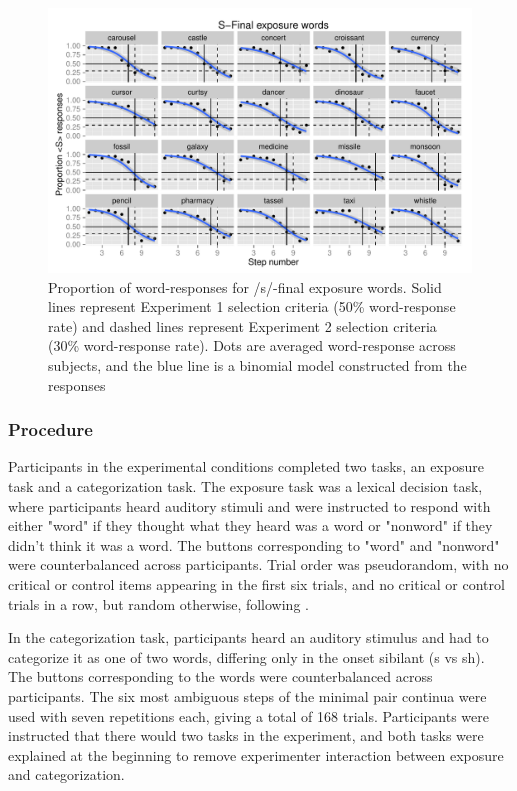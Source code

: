 \begin{figure}
\includegraphics[width=\textwidth]{sfinalpretest.pdf}
\caption{Proportion of word-responses for /s/-final exposure words. Solid lines represent Experiment 1 selection criteria (50\% word-response rate) and dashed lines represent Experiment 2 selection criteria (30\% word-response rate).  Dots are averaged word-response across subjects, and the blue line is a binomial model constructed from the responses}
\end{figure}

\subsubsection{Procedure}

Participants in the experimental conditions completed two tasks, an exposure task and a categorization task.  
The exposure task was a lexical decision task, where participants heard auditory stimuli and were instructed to respond with either "word" if they thought what they heard was a word or "nonword" if they didn't think it was a word.  
The buttons corresponding to "word" and "nonword" were counterbalanced across participants. Trial order was pseudorandom, with no critical or control items appearing in the first six trials, and no critical or control trials in a row, but random otherwise, following \citet{Reinisch2013}.

In the categorization task, participants heard an auditory stimulus and had to categorize it as one of two words, differing only in the onset sibilant (s vs sh).  
The buttons corresponding to the words were counterbalanced across participants.  
The six most ambiguous steps of the minimal pair continua were used with seven repetitions each, giving a total of 168 trials.
Participants were instructed that there would two tasks in the experiment, and both tasks were explained at the beginning to remove experimenter interaction between exposure and categorization.  

